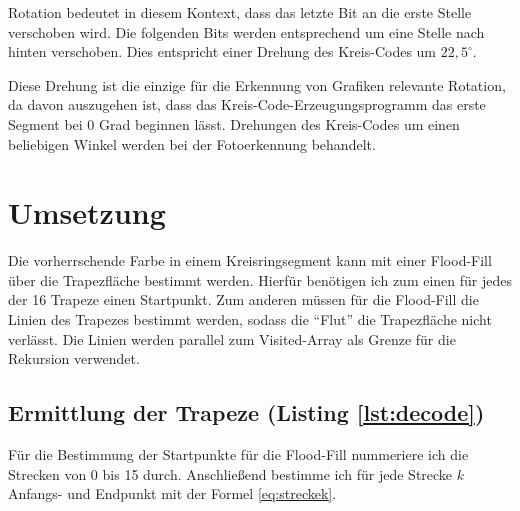 Rotation bedeutet in diesem Kontext, dass das letzte Bit an die erste Stelle verschoben wird. Die folgenden Bits werden entsprechend um eine Stelle nach hinten verschoben. Dies entspricht einer Drehung des Kreis-Codes um \(22,5^{\circ}\).

Diese Drehung ist die einzige für die Erkennung von Grafiken relevante Rotation, da davon auszugehen ist, dass das Kreis-Code-Erzeugungsprogramm das erste Segment bei 0 Grad beginnen lässt. Drehungen des Kreis-Codes um einen beliebigen Winkel werden bei der Fotoerkennung behandelt.
\section{Umsetzung}
Die vorherrschende Farbe in einem Kreisringsegment kann mit einer Flood-Fill über die Trapezfläche bestimmt werden. Hierfür benötigen ich zum einen für jedes der 16 Trapeze einen Startpunkt.
Zum anderen müssen für die Flood-Fill die Linien des Trapezes bestimmt werden, sodass die "`Flut"' die Trapezfläche nicht verlässt. Die Linien werden parallel zum Visited-Array als Grenze für die Rekursion verwendet.

\subsection{Ermittlung der Trapeze (Listing \ref{lst:decode})}
Für die Bestimmung der Startpunkte für die Flood-Fill nummeriere ich die Strecken von 0 bis 15 durch. Anschließend bestimme ich für jede Strecke \(k\) Anfangs- und Endpunkt mit der Formel \eqref{eq:streckek}.

